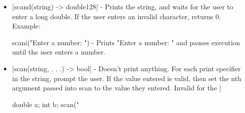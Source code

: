 \documentclass[12pt, letterpaper, oneside]{article}
\begin{document}
\begin{itemize}
		
		\begin{spverbatim}
			scani("Enter a number: ") - Prints "Enter a number: " and pauses execution until the user enters a number.
		\end{spverbatim}
		\item[--] \spverb|scand(string) -> double128| - Prints the string, and waits for the user to enter a long double. If the user enters an invalid character, returns 0. Example: 
		
		
		\begin{spverbatim}
			scani("Enter a number: ") - Prints "Enter a number: " and pauses execution until the user enters a number.
		\end{spverbatim}
		\item[--] \spverb|scan(string, . . .) -> bool| - Doesn't print anything. For each print specifier in the string, prompt the user. If the value entered is valid, then set the nth argument passed into scan to the value they entered. Invalid for the \spverb|%
		
		
		\begin{spverbatim}
			double a;
			int b;
			scan("%
		\end{spverbatim}
		\newpage
	\end{itemize}
\end{document}
